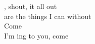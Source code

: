 , shout,  it all out \\
 are the things I can  without \\
Come  \\
I'm ing to you, come  \songwordfb{} \\



